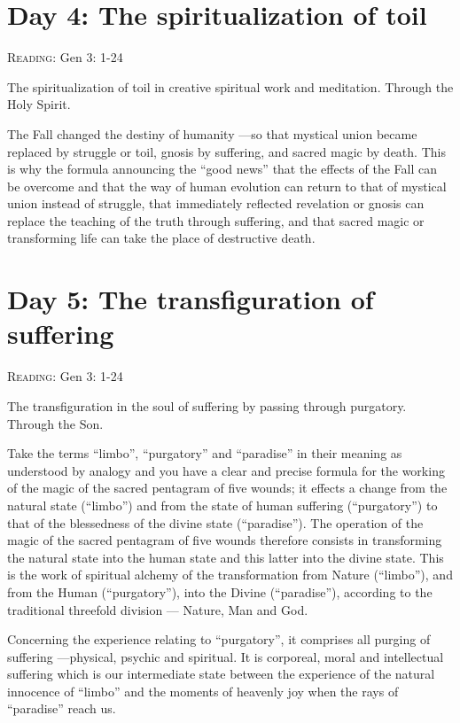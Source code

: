 \section{Day 4: The spiritualization of toil}

\textsc{Reading}: Gen 3: 1-24

The spiritualization of toil in creative spiritual work and meditation. Through the Holy Spirit.

\begin{quotex}
The Fall changed the destiny of humanity —so that mystical union became replaced by struggle or
toil, gnosis by suffering, and sacred magic by death. This is why the formula announcing the ``good news'' that the effects of the Fall can be overcome and that the way of human evolution can return to that of mystical union instead of struggle, that immediately reflected revelation or gnosis can replace the teaching of the truth through suffering, and that sacred magic or transforming life can take the place of destructive death.
\end{quotex}

\section{Day 5: The transfiguration of suffering}

\textsc{Reading}: Gen 3: 1-24

The transfiguration in the soul of suffering by passing through purgatory. Through the Son.

\begin{quotex}
Take the terms ``limbo'', ``purgatory'' and ``paradise'' in their meaning as understood by analogy and you have a clear and precise formula for the working of the magic of the sacred pentagram of five wounds; it effects a change from the natural state (``limbo'') and from the state of human suffering (``purgatory'') to that of the blessedness of the divine state (``paradise''). The operation of the magic of the sacred pentagram of five wounds therefore consists in transforming the natural state into the human state and this latter into the divine state. This is the work of spiritual alchemy of the transformation from Nature (``limbo''), and from the Human (``purgatory''), into the Divine (``paradise''), according to the traditional threefold division — Nature, Man and God. 

\end{quotex}
Concerning the experience relating to ``purgatory'', it comprises all purging of suffering —physical,
psychic and spiritual. It is corporeal, moral and intellectual suffering which is our intermediate state between the experience of the natural innocence of ``limbo'' and the moments of heavenly joy when the rays of ``paradise'' reach us.


